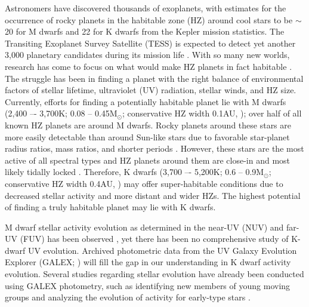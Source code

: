\documentclass[twocolumn]{aastex62}
\begin{document}
Astronomers have discovered thousands of exoplanets, with estimates for the occurrence of rocky planets in the habitable zone (HZ) around cool stars to be $\sim$20 for M dwarfs \citep{Dressing2015} and 22 for K dwarfs \citep{Petigura2013} from the Kepler mission statistics. The Transiting Exoplanet Survey Satellite (TESS) is expected to detect yet another 3,000 planetary candidates during its mission life \citep{Ricker2009, Ricker2014}. With so many new worlds, research has come to focus on what would make HZ planets in fact habitable \citep[e.g.][]{Cockell2016, Kaltenegger2017}. The struggle has been in finding a planet with the right balance of environmental factors of stellar lifetime, ultraviolet (UV) radiation, stellar winds, and HZ size. Currently, efforts for finding a potentially habitable planet lie with M dwarfs (2,400 –- 3,700K; 0.08 -- 0.45M$_{\odot}$; conservative HZ width 0.1AU, \citealt{Kopparapu2013}); over half of all known HZ planets are around M dwarfs. Rocky planets around these stars are more easily detectable than around Sun-like stars due to favorable star-planet radius ratios, mass ratios, and shorter periods \citep{Charbonneau2007}. However, these stars are the most active of all spectral types and HZ planets around them are close-in and most likely tidally locked \citep[e.g.][]{Checlair2017, Barnes2017}. Therefore, K dwarfs (3,700 –- 5,200K; 0.6 -- 0.9M$_{\odot}$; conservative HZ width 0.4AU, \citealt{Kopparapu2013}) may offer super-habitable conditions due to decreased stellar activity and more distant and wider HZs. The highest potential of finding a truly habitable planet may lie with K dwarfs.

M dwarf stellar activity evolution as determined in the near-UV (NUV) and far-UV (FUV) has been observed \citep{Shkolnik2014, Schneider2018}, yet there has been no comprehensive study of K-dwarf UV evolution. Archived photometric data from the UV Galaxy Evolution Explorer (GALEX; \citealt{Martin2004}) will fill the gap in our understanding in K dwarf activity evolution. Several studies regarding stellar evolution have already been conducted using GALEX photometry, such as identifying new members of young moving groups \citep{Shkolnik2010, Rodriguez2010, Rodriguez2013} and analyzing the evolution of activity for early-type stars \citep{Findeisen2011}.

\end{document}
